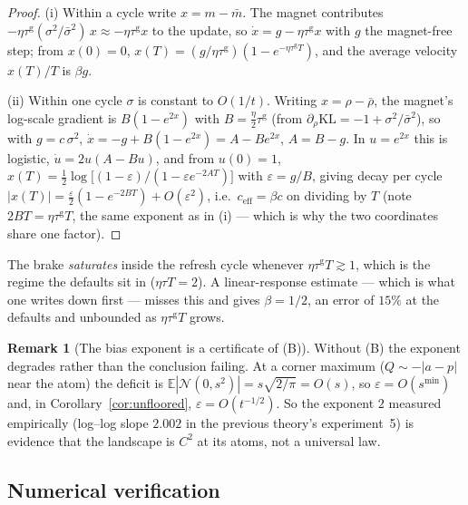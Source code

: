 \documentclass[11pt]{article}
\theoremstyle{definition}
\newtheorem{remark}{Remark}
\newcommand{\E}{\mathbb{E}}
\newcommand{\cN}{\mathcal{N}}
\newcommand{\KL}{\mathrm{KL}}
\begin{document}
\begin{proof}
(i) Within a cycle write $x = m - \bar m$. The magnet contributes
$-\eta\tau^{\mathrm g}(\sigma^2/\bar\sigma^2)\,x \approx
-\eta\tau^{\mathrm g} x$ to the update, so $\dot x = g - \eta\tau^{\mathrm g}x$
with $g$ the magnet-free step; from $x(0) = 0$,
$x(T) = (g/\eta\tau^{\mathrm g})(1 - e^{-\eta\tau^{\mathrm g}T})$, and the
average velocity $x(T)/T$ is $\beta g$.

(ii) Within one cycle $\sigma$ is constant to $O(1/t)$. Writing
$x = \rho - \bar\rho$, the magnet's log-scale gradient is
$B(1 - e^{2x})$ with $B = \tfrac{\eta}{2}\tau^{\mathrm g}$ (from
$\partial_\rho \KL = -1 + \sigma^2/\bar\sigma^2$), so with $g = c\,\sigma^2$,
$\dot x = -g + B(1 - e^{2x}) = A - Be^{2x}$, $A = B - g$. In $u = e^{2x}$ this
is logistic, $\dot u = 2u(A - Bu)$, and from $u(0) = 1$,
$x(T) = \tfrac12 \log\!\big[(1-\varepsilon)/(1 - \varepsilon e^{-2AT})\big]$ with
$\varepsilon = g/B$, giving decay per cycle
$|x(T)| = \tfrac{\varepsilon}{2}(1 - e^{-2BT}) + O(\varepsilon^2)$, i.e.\
$c_{\mathrm{eff}} = \beta c$ on dividing by $T$ (note
$2BT = \eta\tau^{\mathrm g}T$, the same exponent as in (i) --- which is why the
two coordinates share one factor).
\end{proof}

The brake \emph{saturates} inside the refresh cycle whenever
$\eta\tau^{\mathrm g}T \gtrsim 1$, which is the regime the defaults sit in
($\eta\tau T = 2$). A linear-response estimate --- which is what one writes down
first --- misses this and gives $\beta = 1/2$, an error of $15\%$ at the defaults
and unbounded as $\eta\tau^{\mathrm g}T$ grows.

\begin{remark}[The bias exponent is a certificate of (B)]\label{rem:biasexp}
Without (B) the exponent degrades rather than the conclusion failing. At a corner
maximum ($Q \sim -|a - p|$ near the atom) the deficit is
$\E|\cN(0,s^2)| = s\sqrt{2/\pi} = O(s)$, so $\varepsilon = O(s^{\min})$ and, in
Corollary~\ref{cor:unfloored}, $\varepsilon = O(t^{-1/2})$. So the exponent $2$
measured empirically (log--log slope $2.002$ in the previous theory's
experiment~5) is evidence that the landscape is $C^2$ at its atoms, not a
universal law.
\end{remark}

\subsection{Numerical verification}\label{sec:verify}
\end{document}
